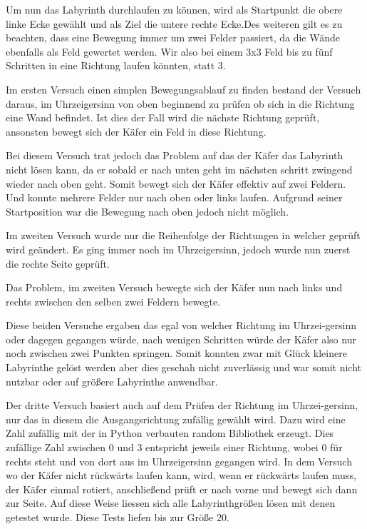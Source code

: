 \documentclass[12pt, a4paper, titlepage]{article}
\begin{document}
\bigskip

Um nun das Labyrinth durchlaufen zu können, wird als Startpunkt die obere linke Ecke gewählt und als Ziel die untere rechte Ecke.Des weiteren gilt es zu beachten, dass eine Bewegung immer um zwei Felder passiert, da die Wände ebenfalls als Feld gewertet werden.
Wir also bei einem 3x3 Feld bis zu fünf Schritten in eine Richtung laufen könnten, statt 3.

\bigskip

Im ersten Versuch einen simplen Bewegungsablauf zu finden bestand der Versuch daraus, im Uhrzeigersinn von oben beginnend zu prüfen ob sich in die Richtung eine Wand befindet.
Ist dies der Fall wird die nächste Richtung geprüft, ansonsten bewegt sich der Käfer ein Feld in diese Richtung.


Bei diesem Versuch trat jedoch das Problem auf das der Käfer das Labyrinth nicht lösen kann, da er sobald er nach unten geht im nächsten schritt zwingend wieder nach oben geht.
Somit bewegt sich der Käfer effektiv auf zwei Feldern.
Und konnte mehrere Felder nur nach oben oder links laufen.
Aufgrund seiner Startposition war die Bewegung nach oben jedoch nicht möglich.

\bigskip

Im zweiten Versuch wurde nur die Reihenfolge der Richtungen in welcher geprüft wird geändert.
Es ging immer noch im Uhrzeigersinn, jedoch wurde nun zuerst die rechte Seite geprüft.

Das Problem, im zweiten Versuch bewegte sich der Käfer nun nach links und rechts zwischen den selben zwei Feldern bewegte.


\bigskip

Diese beiden Versuche ergaben das egal von welcher Richtung im Uhrzei-gersinn oder dagegen gegangen würde, nach wenigen Schritten würde der Käfer also nur noch zwischen zwei Punkten springen.
Somit konnten zwar mit Glück kleinere Labyrinthe gelöst werden aber dies geschah nicht zuverlässig und war somit nicht nutzbar oder auf größere Labyrinthe anwendbar.

\bigskip

Der dritte Versuch basiert auch auf dem Prüfen der Richtung im Uhrzei-gersinn, nur das in diesem die Ausgangsrichtung zufällig gewählt wird.
Dazu wird eine Zahl zufällig mit der in Python verbauten random Bibliothek erzeugt.
Dies zufällige Zahl zwischen 0 und 3 entspricht jeweils einer Richtung, wobei 0 für rechts steht und von dort aus im Uhrzeigersinn gegangen wird.
In dem Versuch wo der Käfer nicht rückwärts laufen kann, wird, wenn er rückwärts laufen muss, der Käfer einmal rotiert, anschließend prüft er nach vorne und bewegt sich dann zur Seite.
Auf diese Weise liessen sich alle Labyrinthgrößen lösen mit denen getestet wurde.
Diese Tests liefen bis zur Größe 20.
\end{document}
